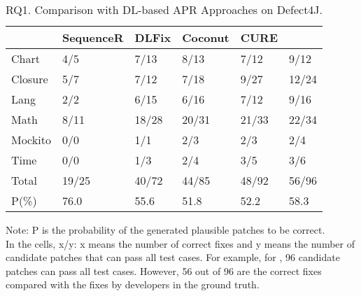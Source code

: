 \begin{table}[t]
  \caption{RQ1. Comparison with DL-based APR Approaches on Defect4J.}
  \vspace{-6pt}
  {\small
			\begin{center}
				\renewcommand{\arraystretch}{1}
				\begin{tabular}{p{0.9cm}<{\centering}|p{1.4cm}<{\centering}|p{1cm}<{\centering}|p{1cm}<{\centering}|p{1cm}<{\centering}|p{1cm}<{\centering}}
					
					\hline
					&\textbf{SequenceR}&\textbf{DLFix}& \textbf{Coconut}&\textbf{CURE}&\textbf{\tool}\\
					\hline
					Chart  & 4/5   & 7/13  & 8/13  & 7/12   & 9/12\\
					Closure& 5/7   & 7/12  & 7/18  & 9/27   & 12/24\\
					Lang   & 2/2   & 6/15  & 6/16  & 7/12   & 9/16\\
					Math    & 8/11  & 18/28 & 20/31 & 21/33  & 22/34\\
					Mockito & 0/0   & 1/1   & 2/3   & 2/3    & 2/4\\
					Time    & 0/0   & 1/3   & 2/4   & 3/5    & 3/6\\
					\hline
					Total   & 19/25 & 40/72 & 44/85 & 48/92  & 56/96\\
					\hline
					P(\%)  & 76.0  & 55.6  & 51.8  & 52.2   & 58.3\\
					\hline
				\end{tabular}
			{\footnotesize{
				Note: P is the probability of the generated plausible patches to be correct.\\
				In the cells, x/y: x means the number of correct fixes and y means the number of candidate patches that can pass all test cases. For example, for \tool, 96 candidate patches can pass all test cases. However, 56 out of 96 are the correct fixes compared with the fixes by developers in the ground truth.}}
				\label{RQ1_defect4j}
			\end{center}
                }
		\end{table}




















